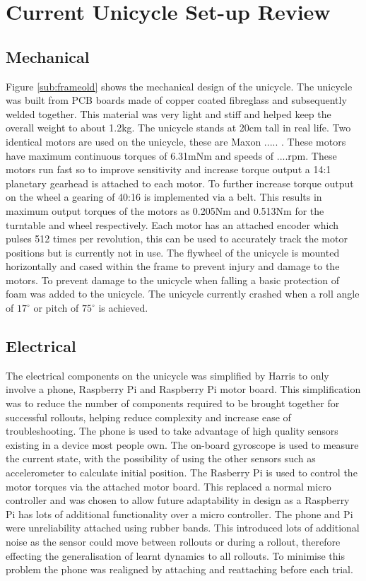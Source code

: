 \documentclass[twoside,twocolumn,12pt]{article}
\begin{document}
\section{Current Unicycle Set-up Review}
\subsection{Mechanical}
Figure \ref{sub:frameold} shows the mechanical design of the unicycle. The unicycle was built from PCB boards made of copper coated fibreglass and subsequently welded together. This material was very light and stiff and helped keep the overall weight to about 1.2kg. The unicycle stands at 20cm tall in real life.
\newline
Two identical motors are used on the unicycle, these are Maxon ..... \cite{maxonmotor}. These motors have maximum continuous torques of 6.31mNm and speeds of ....rpm. These motors run fast so to improve sensitivity and increase torque output a 14:1 planetary gearhead \cite{gearhead} is attached to each motor. To further increase torque output on the wheel a gearing of 40:16 is implemented via a belt. This results in maximum output torques of the motors as 0.205Nm and 0.513Nm for the turntable and wheel respectively. Each motor has an attached encoder which pulses 512 times per revolution, this can be used to accurately track the motor positions but is currently not in use.
\newline
The flywheel of the unicycle is mounted horizontally and cased within the frame to prevent injury and damage to the motors.
\newline
To prevent damage to the unicycle when falling a basic protection of foam was added to the unicycle. The unicycle currently crashed when a roll angle of $17^{\circ}$ or pitch of $75^{\circ}$ is achieved. 
\subsection{Electrical}
The electrical components on the unicycle was simplified by Harris \cite{arsalan} to only involve a phone, Raspberry Pi and Raspberry Pi motor board. This simplification was to reduce the number of components required to be brought together for successful rollouts, helping reduce complexity and increase ease of troubleshooting. 
\newline
The phone is used to take advantage of high quality sensors existing in a device most people own. The on-board gyroscope is used to measure the current state, with the possibility of using the other sensors such as accelerometer to calculate initial position. 
\newline
The Rasberry Pi is used to control the motor torques via the attached motor board. This replaced a normal micro controller and was chosen to allow future adaptability in design as a Raspberry Pi has lots of additional functionality over a micro controller.
\newline
The phone and Pi were unreliability attached using rubber bands. This introduced lots of additional noise as the sensor could move between rollouts or during a rollout, therefore effecting the generalisation of learnt dynamics to all rollouts. To minimise this problem the phone was realigned by attaching and reattaching before each trial. 
\end{document}

